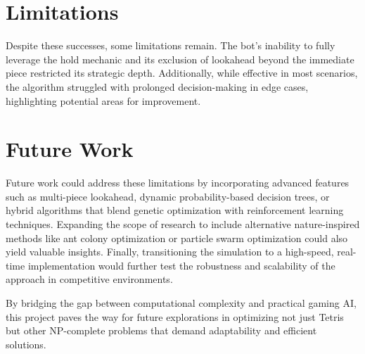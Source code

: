 \documentclass[a4paper, 12pt]{extreport}
\begin{document}
		\section{Limitations}
		
		Despite these successes, some limitations remain. The bot's inability to fully leverage the hold mechanic and its exclusion of lookahead beyond the immediate piece restricted its strategic depth. Additionally, while effective in most scenarios, the algorithm struggled with prolonged decision-making in edge cases, highlighting potential areas for improvement.
		
		\section{Future Work}
		
		Future work could address these limitations by incorporating advanced features such as multi-piece lookahead, dynamic probability-based decision trees, or hybrid algorithms that blend genetic optimization with reinforcement learning techniques. Expanding the scope of research to include alternative nature-inspired methods like ant colony optimization or particle swarm optimization could also yield valuable insights. Finally, transitioning the simulation to a high-speed, real-time implementation would further test the robustness and scalability of the approach in competitive environments.
		
		By bridging the gap between computational complexity and practical gaming AI, this project paves the way for future explorations in optimizing not just Tetris but other NP-complete problems that demand adaptability and efficient solutions.
	
	\printbibliography[heading={bibnumbered}, title={References}]
	
\end{document}
